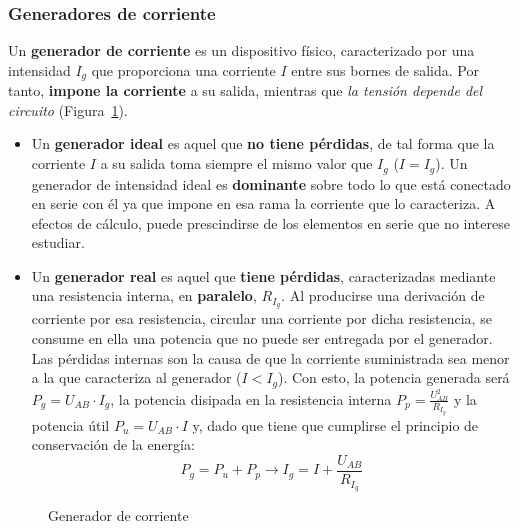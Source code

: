 \documentclass[11pt]{book} %
\begin{document}
	\subsubsection{Generadores de corriente}
	Un \textbf{generador de corriente} es un dispositivo físico, caracterizado por una intensidad $I_g$ que proporciona una corriente $I$ entre sus bornes de salida. Por tanto, \textbf{impone la corriente} a su salida, mientras que \emph{la tensión depende del circuito} (Figura~\ref{fig.fuentecorriente}).
	\begin{itemize}
		\item Un \textbf{generador ideal} es aquel que \textbf{no tiene pérdidas}, de tal forma que la corriente $I$ a su salida toma siempre el mismo valor que $I_g$ ($I=I_g$). Un generador de intensidad ideal es \textbf{dominante} sobre todo lo que está conectado en serie con él ya que impone en esa rama la corriente que lo caracteriza. A efectos de cálculo, puede prescindirse de los elementos en serie que no interese estudiar. 
		\item Un \textbf{generador real} es aquel que \textbf{tiene pérdidas}, caracterizadas mediante una resistencia interna, en \textbf{paralelo}, $R_{I_g}$. Al producirse una derivación de corriente por esa resistencia, circular una corriente por dicha resistencia, se consume en ella una potencia que no puede ser entregada por el generador. Las pérdidas internas son la causa de que la corriente suministrada sea menor a la que caracteriza al generador ($I<I_g$). Con esto, la potencia generada será $P_g=U_{AB}\cdot I_g$, la potencia disipada en la resistencia interna $P_p=\frac{U_{AB}^2}{R_{I_g}}$ y la potencia útil $P_u=U_{AB}\cdot I$ y, dado que tiene que cumplirse el principio de conservación de la energía:
		\begin{equation}
			P_g=P_u+P_p\rightarrow \boxed{I_g=I+ \dfrac{U_{AB}}{R_{I_g}}}
		\end{equation}
	\end{itemize}
	\begin{figure}[htbp]
		\centering
		\hfil
		\caption{Generador de corriente}
		\label{fig.fuentecorriente}
	\end{figure}
	
\end{document}
